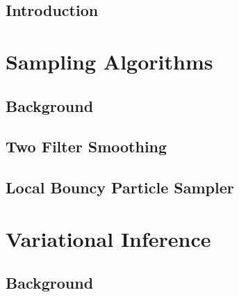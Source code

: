 
\singlespacing
\setcounter{tocdepth}{2}
\setcounter{secnumdepth}{2}
\iftoc\tableofcontents\fi
{}
\setcounter{page}{1}
\onehalfspacing

\raggedbottom



\doublespacing
\flushbottom

\chapter{Introduction}\setcounter{page}{1}

\ifintro\fi

\part{Sampling Algorithms} %

\chapter{Background}

\ifbgs\fi

\chapter{Two Filter Smoothing}

\iftfs\fi

\chapter{Local Bouncy Particle Sampler}

\iflbps\fi

\part{Variational Inference} %

\chapter{Background}

